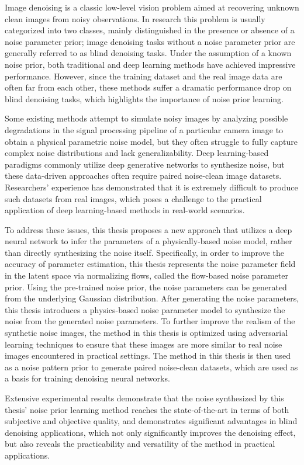 Image denoising is a classic low-level vision problem aimed at recovering unknown clean images from noisy observations. In research this problem is usually categorized into two classes, mainly distinguished in the presence or absence of a noise parameter prior; image denoising tasks without a noise parameter prior are generally referred to as blind denoising tasks. Under the assumption of a known noise prior, both traditional and deep learning methods have achieved impressive performance. However, since the training dataset and the real image data are often far from each other, these methods suffer a dramatic performance drop on blind denoising tasks, which highlights the importance of noise prior learning.

Some existing methods attempt to simulate noisy images by analyzing possible degradations in the signal processing pipeline of a particular camera image to obtain a physical parametric noise model, but they often struggle to fully capture complex noise distributions and lack generalizability. Deep learning-based paradigms commonly utilize deep generative networks to synthesize noise, but these data-driven approaches often require paired noise-clean image datasets. Researchers' experience has demonstrated that it is extremely difficult to produce such datasets from real images, which poses a challenge to the practical application of deep learning-based methods in real-world scenarios.

To address these issues, this thesis proposes a new approach that utilizes a deep neural network to infer the parameters of a physically-based noise model, rather than directly synthesizing the noise itself. Specifically, in order to improve the accuracy of parameter estimation, this thesis represents the noise parameter field in the latent space via normalizing flows, called the flow-based noise parameter prior. Using the pre-trained noise prior, the noise parameters can be generated from the underlying Gaussian distribution. After generating the noise parameters, this thesis introduces a physics-based noise parameter model to synthesize the noise from the generated noise parameters. To further improve the realism of the synthetic noise images, the method in this thesis is optimized using adversarial learning techniques to ensure that these images are more similar to real noise images encountered in practical settings. The method in this thesis is then used as a noise pattern prior to generate paired noise-clean datasets, which are used as a basis for training denoising neural networks.

Extensive experimental results demonstrate that the noise synthesized by this thesis' noise prior learning method reaches the state-of-the-art in terms of both subjective and objective quality, and demonstrates significant advantages in blind denoising applications, which not only significantly improves the denoising effect, but also reveals the practicability and versatility of the method in practical applications.